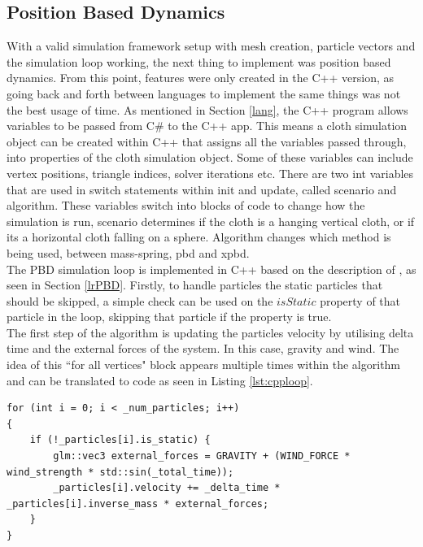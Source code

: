 \documentclass[12pt,a4paper]{article}
\begin{document}
 
\subsection{Position Based Dynamics}
With a valid simulation framework setup with mesh creation, particle vectors and the simulation loop working, the next thing to implement was position based dynamics. From this point, features were only created in the C++ version, as going back and forth between languages to implement the same things was not the best usage of time. As mentioned in Section \ref{lang}, the C++ program allows variables to be passed from C\# to the C++ app. This means a cloth simulation object can be created within C++ that assigns all the variables passed through, into properties of the cloth simulation object. Some of these variables can include vertex positions, triangle indices, solver iterations etc. There are two int variables that are used in switch statements within init and update, called scenario and algorithm. These variables switch into blocks of code to change how the simulation is run, scenario determines if the cloth is a hanging vertical cloth, or if its a horizontal cloth falling on a sphere. Algorithm changes which method is being used, between mass-spring, pbd and xpbd. \\

The PBD simulation loop is implemented in C++ based on the description of \cite{muller2007position}, as seen in Section \ref{lrPBD}.  Firstly, to handle particles the static particles that should be skipped, a simple check can be used on the $isStatic$ property of that particle in the loop, skipping that particle if the property is true. \\
The first step of the algorithm is updating the particles velocity by utilising delta time and the external forces of the system. In this case, gravity and wind. The idea of this ``for all vertices" block appears multiple times within the algorithm and can be translated to code as seen in Listing \ref{lst:cpploop}.

\begin{lstlisting}[caption={Updating particles velocity using external forces},label={lst:cpploop}]
for (int i = 0; i < _num_particles; i++)
{
	if (!_particles[i].is_static) {
		glm::vec3 external_forces = GRAVITY + (WIND_FORCE * wind_strength * std::sin(_total_time));
		_particles[i].velocity += _delta_time * _particles[i].inverse_mass * external_forces;
	}
}
\end{lstlisting}
\end{document}
